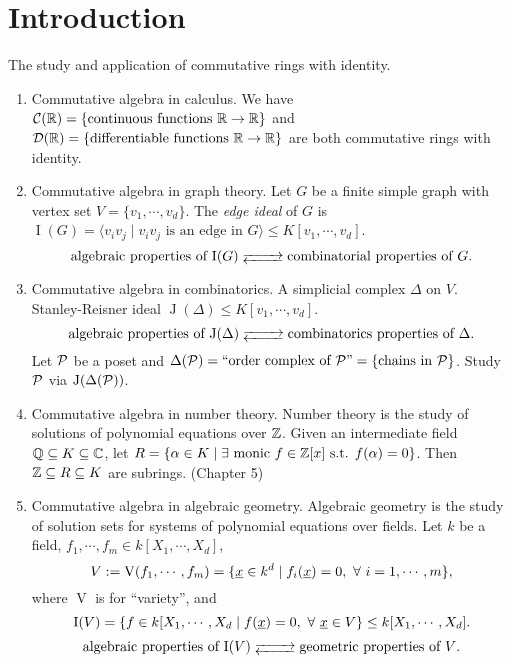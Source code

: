 \chapter*{Introduction}


The study and application of commutative rings with identity.
    \begin{enumerate}
        \item Commutative algebra in calculus. We have $\mathcal{C}(\mathbb{R}) = \{\text{continuous functions }\mathbb{R} \to \mathbb{R}\}$ and $\mathcal{D}(\mathbb{R}) = \{\text{differentiable functions }\mathbb{R} \to \mathbb{R}\}$ are both commutative rings with identity.
        \item Commutative algebra in graph theory. Let $G$ be a finite simple graph with vertex set $V = \{v_1,\cdots,v_d\}$. The \emph{edge ideal} of $G$ is $\operatorname{I}(G) = \langle v_iv_j \mid v_iv_j \text{ is an edge in }G \rangle \leq K[v_1,\cdots,v_d]$. 
            \[\text{algebraic properties of $\operatorname{I}(G)$} \myrightleftarrows{\rule{0.8cm}{0cm}} \text{combinatorial properties of $G$}.\]
        \item Commutative algebra in combinatorics.  A simplicial complex $\Delta$ on $V$. Stanley-Reisner ideal $\operatorname{J}(\Delta) \leq K[v_1,\cdots,v_d]$. 
            \[\text{algebraic properties of $\operatorname{J}(\Delta)$} \myrightleftarrows{\rule{0.8cm}{0cm}} \text{combinatorics properties of $\Delta$}.\]
            Let $\mathcal{P}$ be a poset and $\Delta(\mathcal{P}) = ``\text{order complex of $\mathcal{P}$''} = \{\text{chains in $\mathcal{P}$}\}$. Study $\mathcal{P}$ via $\operatorname{J}(\Delta(\mathcal{P}))$. 
        \item Commutative algebra in number theory. Number theory is the study of solutions of polynomial equations over $\mathbb{Z}$. Given an intermediate field $\mathbb{Q} \subseteq K \subseteq \mathbb{C}$, let $R = \{\alpha \in K \mid \exists \  \text{monic }f \in \mathbb{Z}[x] \text{ s.t. } f(\alpha) = 0\}$. Then $\mathbb{Z} \subseteq R \subseteq K$ are subrings. (Chapter 5)
        \item Commutative algebra in algebraic geometry. Algebraic geometry is the study of solution sets for systems of polynomial equations over fields. Let $k$ be a field, $f_1,\cdots,f_m \in k[X_1,\cdots,X_d]$, 
            \[V := \operatorname{V}(f_1,\cdots,f_m) = \{\underline x \in k^d \mid f_i(\underline x) = 0,\ \forall \  i = 1,\cdots,m\},\] 
            where $\operatorname{V}$ is for ``variety'', and 
            \[\operatorname{I}(V) = \{f \in k[X_1,\cdots,X_d \mid f(\underline x) = 0,\ \forall \  \underline x \in V\} \leq k[X_1,\cdots,X_d].\] 
            \[\text{algebraic properties of $\operatorname{I}(V)$} \myrightleftarrows{\rule{0.8cm}{0cm}} \text{geometric properties of $V$}.\]
    \end{enumerate}

